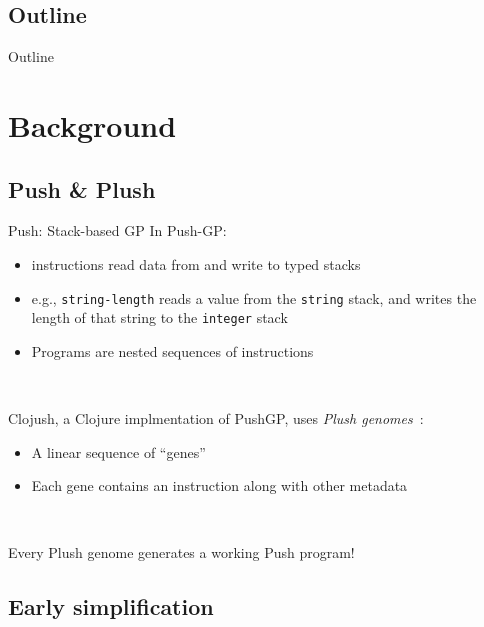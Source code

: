 \documentclass{beamer}
\begin{document}
\subsection*{Outline}

\begin{frame}{Outline}
  \tableofcontents[hideallsubsections]
\end{frame}


\section{Background}

\subsection{Push \& Plush}

\begin{frame}{Push: Stack-based GP}
In Push-GP:
\begin{itemize}
	\item instructions read data from and write to typed stacks
	\item e.g., \texttt{string-length} reads a value from the \texttt{string} stack, and writes the length of that string to the \texttt{integer} stack
	\item Programs are nested sequences of instructions
\end{itemize}

~

Clojush, a Clojure implmentation of PushGP, uses \emph{Plush genomes}~\cite{Helmuth:2016:GPTP}:
\begin{itemize}
	\item A linear sequence of ``genes''
	\item Each gene contains an instruction along with other metadata
\end{itemize}

~

Every Plush genome generates a working Push program!

\end{frame}

\subsection{Early simplification}
\end{document}
